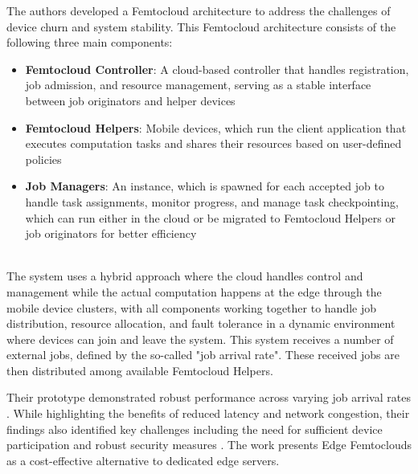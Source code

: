 The authors developed a Femtocloud architecture to address the challenges of device churn and system stability. This Femtocloud architecture consists of the following three main components: 
\begin{itemize}
  \item \textbf{Femtocloud Controller}: A cloud-based controller that handles registration, job admission, and resource management, serving as a stable interface between job originators and helper devices
  \item \textbf{Femtocloud Helpers}: Mobile devices, which run the client application that executes computation tasks and shares their resources based on user-defined policies
  \item \textbf{Job Managers}: An instance, which is spawned for each accepted job to handle task assignments, monitor progress, and manage task checkpointing, which can run either in the cloud or be migrated to Femtocloud Helpers or job originators for better efficiency
\end{itemize}
~\\
The system uses a hybrid approach where the cloud handles control and management while the actual computation happens at the edge through the mobile device clusters, with all components working together to handle job distribution, resource allocation, and fault tolerance in a dynamic environment where devices can join and leave the system. This system receives a number of external jobs, defined by the so-called "job arrival rate". These received jobs are then distributed among available Femtocloud Helpers.

Their prototype demonstrated robust performance across varying job arrival rates \cite{relatedwork:mobilecloud}. While highlighting the benefits of reduced latency and network congestion, their findings also identified key challenges including the need for sufficient device participation and robust security measures \cite{relatedwork:mobilecloud}. The work presents Edge Femtoclouds as a cost-effective alternative to dedicated edge servers. 

